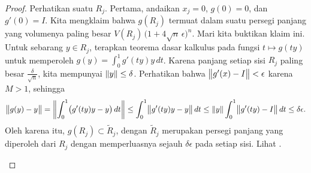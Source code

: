 \begin{proof}
Perhatikan suatu $R_j$.
Pertama, andaikan $x_j=0$, $g(0) = 0$, dan $g'(0) = I$.
Kita mengklaim bahwa
$g(R_j)$ termuat dalam suatu
persegi panjang yang volumenya paling besar $V(R_j) \, {\bigl(1+4\sqrt{n} \, \epsilon\bigr)}^n$.
Mari kita buktikan klaim ini.
Untuk sebarang $y \in R_j$,
terapkan teorema dasar kalkulus
pada fungsi $t \mapsto g(ty)$ untuk memperoleh
$g(y) = \int_0^1 g'(ty)y \,dt$.  Karena panjang setiap
sisi $R_j$ paling besar $\frac{\delta}{\sqrt{n}}$,
kita mempunyai $\lVert {y} \rVert \leq \delta$.
Perhatikan bahwa $\bigl\lVert {g'(x)-I} \bigr\rVert < \epsilon$ karena $M > 1$,
sehingga
\begin{equation*}
\bigl\lVert {g(y)-y} \bigr\rVert
=
\left\lVert {\int_0^1 \bigl(g'(ty) y - y\bigr) \,dt} \right\rVert
\leq
\int_0^1 \bigl\lVert {g'(ty) y - y} \bigr\rVert \,dt
\leq
\lVert {y} \rVert \int_0^1 \bigl\lVert {g'(ty) - I} \bigr\rVert \,dt
\leq
\delta \epsilon .
\end{equation*}
Oleh karena itu, $g(R_j) \subset \widetilde{R}_j$, dengan
$\widetilde{R}_j$ merupakan persegi panjang yang diperoleh dari
$R_j$ dengan memperluasnya sejauh
$\delta \epsilon$ pada setiap sisi.  Lihat .

\begin{myfigureht}
\caption{Citra $R_j$ di bawah $g$ terletak di dalam
$\widetilde{R}_j$.  Sebuah titik contoh $y \in R_j$ (sebenarnya pada batas $R_j$) ditandai,
dan $g(y)$ harus terletak dalam jarak $\delta\epsilon$ dari $y$
(juga ditandai).\label{changeofvarssq:fig}}
\end{myfigureht}



\end{proof}
